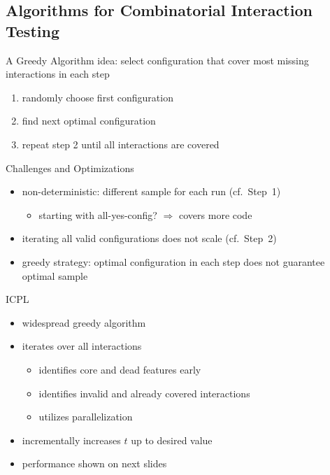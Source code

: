 \subsection{Algorithms for Combinatorial Interaction Testing}
\begin{frame}{\myframetitle{} }
	\begin{mycolumns}[widths={63}]
		\begin{definition}{A Greedy Algorithm}
			idea: select configuration that cover most missing interactions in each step
			\begin{enumerate}
				\item randomly choose first configuration
				\item find next optimal configuration
				\item repeat step 2 until all interactions are covered
			\end{enumerate}
		\end{definition}
		\pause
		\begin{note}{Challenges and Optimizations}
			\begin{itemize}
				\item non-deterministic: different sample for each run (cf.\ Step~1)
				\begin{itemize}
					\item starting with all-yes-config? $\Rightarrow$ covers more code
				\end{itemize}
				\item iterating all valid configurations does not scale (cf.\ Step~2)
				\item greedy strategy: optimal configuration in each step does not guarantee optimal sample
			\end{itemize}
		\end{note}
	\mynextcolumn
		\pause
		\begin{definition}{ICPL\mysource{\icpl}}
			\begin{itemize}
				\item widespread greedy algorithm
				\item iterates over all interactions
				\begin{itemize}
					\item identifies core and dead features early
					\item identifies invalid and already covered interactions
					\item utilizes parallelization
				\end{itemize}
				\item incrementally increases $t$ up to desired value
				\item performance shown on next slides
			\end{itemize}
		\end{definition}
	\end{mycolumns}
\end{frame}

